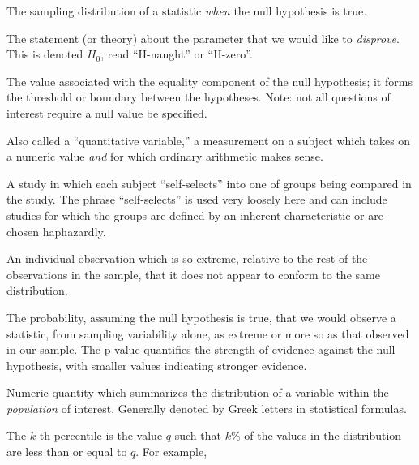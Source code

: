 \documentclass[
  letterpaper,
  DIV=11,
  numbers=noendperiod]{scrreprt}
\providecommand{\tightlist}{%
  \setlength{\itemsep}{0pt}\setlength{\parskip}{0pt}}\usepackage{longtable,booktabs,array}
\theoremstyle{definition}
\theoremstyle{definition}
\theoremstyle{plain}
\theoremstyle{remark}
\begin{document}
\begin{description}
\tightlist
\item[Null Distribution (Definition~\ref{def-null-distribution})]
The sampling distribution of a statistic \emph{when} the null hypothesis
is true.
\item[Null Hypothesis (Definition~\ref{def-null-hypothesis})]
The statement (or theory) about the parameter that we would like to
\emph{disprove}. This is denoted \(H_0\), read ``H-naught'' or
``H-zero''.
\item[Null Value (Definition~\ref{def-null-value})]
The value associated with the equality component of the null hypothesis;
it forms the threshold or boundary between the hypotheses. Note: not all
questions of interest require a null value be specified.
\item[Numeric Variable (Definition~\ref{def-numeric})]
Also called a ``quantitative variable,'' a measurement on a subject
which takes on a numeric value \emph{and} for which ordinary arithmetic
makes sense.
\item[Observational Study (Definition~\ref{def-observational-study})]
A study in which each subject ``self-selects'' into one of groups being
compared in the study. The phrase ``self-selects'' is used very loosely
here and can include studies for which the groups are defined by an
inherent characteristic or are chosen haphazardly.
\item[Outlier (Definition~\ref{def-outlier})]
An individual observation which is so extreme, relative to the rest of
the observations in the sample, that it does not appear to conform to
the same distribution.
\item[P-Value (Definition~\ref{def-pvalue})]
The probability, assuming the null hypothesis is true, that we would
observe a statistic, from sampling variability alone, as extreme or more
so as that observed in our sample. The p-value quantifies the strength
of evidence against the null hypothesis, with smaller values indicating
stronger evidence.
\item[Parameter (Definition~\ref{def-parameter})]
Numeric quantity which summarizes the distribution of a variable within
the \emph{population} of interest. Generally denoted by Greek letters in
statistical formulas.
\item[Percentile (Definition~\ref{def-percentile})]
The \(k\)-th percentile is the value \(q\) such that \(k\)\% of the
values in the distribution are less than or equal to \(q\). For example,
\end{description}
\end{document}
